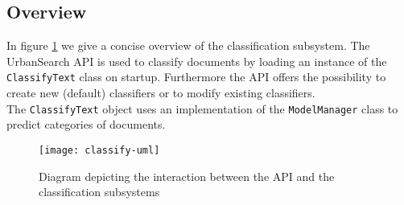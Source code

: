 \subsection{Overview}
In figure \ref{fig:classify-uml} we give a concise overview of the classification subsystem. The UrbanSearch API is used to classify documents by loading an instance of the \texttt{ClassifyText} class on startup. Furthermore the API offers the possibility to create new (default) classifiers or to modify existing classifiers.\\
The \texttt{ClassifyText} object uses an implementation of the \texttt{ModelManager} class to predict categories of documents.
\begin{figure}[h]
\centering
\texttt{[image: classify-uml]}
\caption{Diagram depicting the interaction between the API and the classification subsystems}
\label{fig:classify-uml}
\end{figure}
